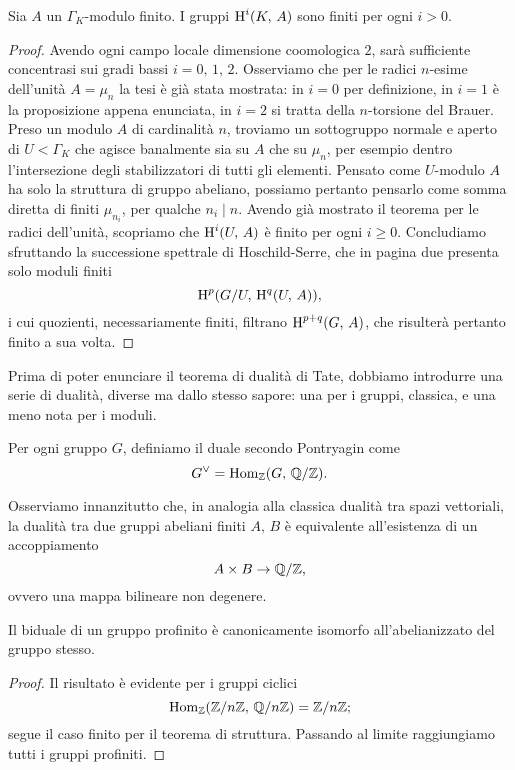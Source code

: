 \begin{corollary} \label{finiti}
	Sia $ A $ un $ \Gamma_K $-modulo finito. I gruppi $ \operatorname{H}^i(K, \, A) $ sono finiti per ogni $ i > 0 $.
\end{corollary}
\begin{proof}
	Avendo ogni campo locale dimensione coomologica $ 2 $, sarà sufficiente concentrasi sui gradi bassi $ i = 0, \, 1, \, 2 $. Osserviamo che per le radici $ n $-esime dell'unità $ A = \mu_n $ la tesi è già stata mostrata: in $ i = 0 $ per definizione, in $ i = 1 $ è la proposizione appena enunciata, in $ i = 2 $ si tratta della $ n $-torsione del Brauer. Preso un modulo $ A $ di cardinalità $ n $, troviamo un sottogruppo normale e aperto di $ U < \Gamma_K $ che agisce banalmente sia su $ A $ che su $ \mu_n $, per esempio dentro l'intersezione degli stabilizzatori di tutti gli elementi. Pensato come $ U $-modulo $ A $ ha solo la struttura di gruppo abeliano, possiamo pertanto pensarlo come somma diretta di finiti $ \mu_{n_i} $, per qualche $ n_i \mid n $. Avendo già mostrato il teorema per le radici dell'unità, scopriamo che $ \operatorname{H}^i(U, \, A) $ è finito per ogni $ i \geq 0 $. Concludiamo sfruttando la successione spettrale di Hoschild-Serre, che in pagina due presenta solo moduli finiti
	\[ \operatorname{H}^p(G/U, \, \operatorname{H}^q(U, \, A)), \]
	i cui quozienti, necessariamente finiti, filtrano $ \operatorname{H}^{p+q}(G, \, A) $, che risulterà pertanto finito a sua volta.
\end{proof}

Prima di poter enunciare il teorema di dualità di Tate, dobbiamo introdurre una serie di dualità, diverse ma dallo stesso sapore: una per i gruppi, classica, e una meno nota per i moduli.

\begin{definition}
	Per ogni gruppo $ G $, definiamo il duale secondo Pontryagin come
	\[ G^\vee = \operatorname{Hom}_{\mathbb{Z}}(G, \, \mathbb{Q}/\mathbb{Z}). \]
\end{definition}

Osserviamo innanzitutto che, in analogia alla classica dualità tra spazi vettoriali, la dualità tra due gruppi abeliani finiti $ A, \, B $ è equivalente all'esistenza di un accoppiamento
\[ A \times B \to \mathbb{Q}/\mathbb{Z}, \]
ovvero una mappa bilineare non degenere.

\begin{proposition}
	Il biduale di un gruppo profinito è canonicamente isomorfo all'abelianizzato del gruppo stesso. 
\end{proposition}
\begin{proof}
	Il risultato è evidente per i gruppi ciclici
	\[ \operatorname{Hom}_{\mathbb{Z}}(\mathbb{Z}/n\mathbb{Z}, \, \mathbb{Q}/n\mathbb{Z}) = \mathbb{Z}/n\mathbb{Z};  \]
	segue il caso finito per il teorema di struttura. Passando al limite raggiungiamo tutti i gruppi profiniti.
\end{proof}

